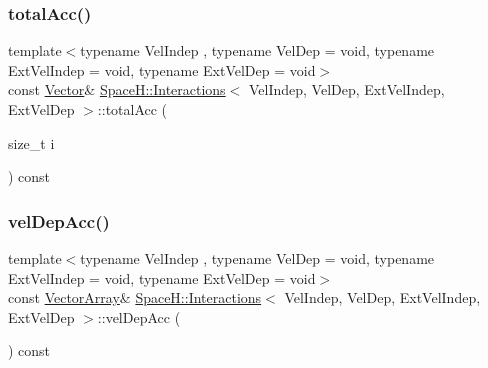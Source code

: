 \mbox{\label{class_space_h_1_1_interactions_ae59b86cfff2e966076f90f1ebed099dd}} 
\subsubsection{\texorpdfstring{total\+Acc()}{totalAcc()}\hspace{0.1cm}{\footnotesize\ttfamily [2/2]}}
{\footnotesize\ttfamily template$<$typename Vel\+Indep , typename Vel\+Dep  = void, typename Ext\+Vel\+Indep  = void, typename Ext\+Vel\+Dep  = void$>$ \\
const \mbox{\hyperlink{class_space_h_1_1_interactions_aaebe228fb44635e85cdb8cc9c10d30d1}{Vector}}\& \mbox{\hyperlink{class_space_h_1_1_interactions}{Space\+H\+::\+Interactions}}$<$ Vel\+Indep, Vel\+Dep, Ext\+Vel\+Indep, Ext\+Vel\+Dep $>$\+::total\+Acc (\begin{DoxyParamCaption}\item[{size\+\_\+t}]{i }\end{DoxyParamCaption}) const\hspace{0.3cm}{\ttfamily [inline]}}

\mbox{\label{class_space_h_1_1_interactions_ade044b9e2a362b35aee04462d70d49ae}} 
\subsubsection{\texorpdfstring{vel\+Dep\+Acc()}{velDepAcc()}\hspace{0.1cm}{\footnotesize\ttfamily [1/2]}}
{\footnotesize\ttfamily template$<$typename Vel\+Indep , typename Vel\+Dep  = void, typename Ext\+Vel\+Indep  = void, typename Ext\+Vel\+Dep  = void$>$ \\
const \mbox{\hyperlink{class_space_h_1_1_interactions_ac9d9b24b469c4be73b96ce0f09f93fcf}{Vector\+Array}}\& \mbox{\hyperlink{class_space_h_1_1_interactions}{Space\+H\+::\+Interactions}}$<$ Vel\+Indep, Vel\+Dep, Ext\+Vel\+Indep, Ext\+Vel\+Dep $>$\+::vel\+Dep\+Acc (\begin{DoxyParamCaption}{ }\end{DoxyParamCaption}) const\hspace{0.3cm}{\ttfamily [inline]}}

